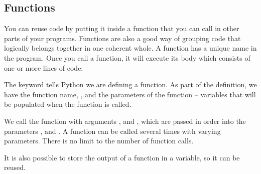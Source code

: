 \subsection{Functions}
\label{\detokenize{lesson/prg/python_intro:functions}}
You can reuse code by putting it inside a function that you can call
in other parts of your programs. Functions are also a good way of
grouping code that logically belongs together in one coherent whole. A
function has a unique name in the program. Once you call a function, it
will execute its body which consists of one or more lines of code:

\begin{sphinxVerbatim}[commandchars=\\\{\}]
   
     \PYGZbs{}
                        \PYGZbs{}
                        \PYGZbs{}
                      

  
\end{sphinxVerbatim}

The  keyword tells Python we are defining a function. As part
of the definition, we have the function name, , and
the parameters of the function -- variables that will be populated
when the function is called.

We call the function with arguments ,  and , which are
passed in order into the parameters ,  and .  A
function can be called several times with varying parameters. There is
no limit to the number of function calls.

It is also possible to store the output of a function in a variable,
so it can be reused.

